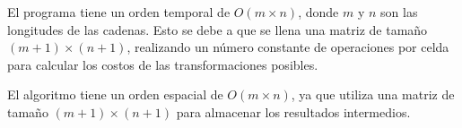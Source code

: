 El programa tiene un orden temporal de \(O(m \times n)\), donde \(m\) y \(n\) son las longitudes de las cadenas. Esto se debe a que se llena una matriz de tamaño \( (m+1) \times (n+1) \), realizando un número constante de operaciones por celda para calcular los costos de las transformaciones posibles.

El algoritmo tiene un orden espacial de \(O(m \times n)\), ya que utiliza una matriz de tamaño \( (m+1) \times (n+1) \) para almacenar los resultados intermedios.

